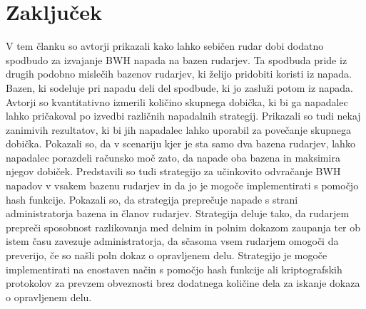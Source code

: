 \documentclass[12pt]{article}
\begin{document}
\section{Zaključek}
V tem članku so avtorji prikazali kako lahko sebičen rudar dobi dodatno spodbudo za izvajanje BWH napada na bazen rudarjev. Ta spodbuda pride iz drugih podobno mislečih bazenov rudarjev, ki želijo pridobiti koristi iz napada. Bazen, ki sodeluje pri napadu deli del spodbude, ki jo zasluži potom iz napada. Avtorji so kvantitativno izmerili količino skupnega dobička, ki bi ga napadalec lahko pričakoval po izvedbi različnih napadalnih strategij. Prikazali so tudi nekaj zanimivih rezultatov, ki bi jih napadalec lahko uporabil za povečanje skupnega dobička. Pokazali so, da v scenariju kjer je sta samo dva bazena rudarjev, lahko napadalec porazdeli računsko moč zato, da napade oba bazena in maksimira njegov dobiček. Predstavili so tudi strategijo za učinkovito odvračanje BWH napadov v vsakem bazenu rudarjev in da jo je mogoče implementirati s pomočjo hash funkcije. Pokazali so, da strategija preprečuje napade s strani administratorja bazena in članov rudarjev. Strategija deluje tako, da rudarjem prepreči sposobnost razlikovanja med delnim in polnim dokazom zaupanja  ter ob istem času zavezuje administratorja, da sčasoma vsem rudarjem omogoči da preverijo, če so našli poln dokaz o opravljenem delu. Strategijo je mogoče implementirati na enostaven način s pomočjo hash funkcije ali kriptografskih protokolov za prevzem obveznosti brez dodatnega količine dela za iskanje dokaza o opravljenem delu.
\end{document}
